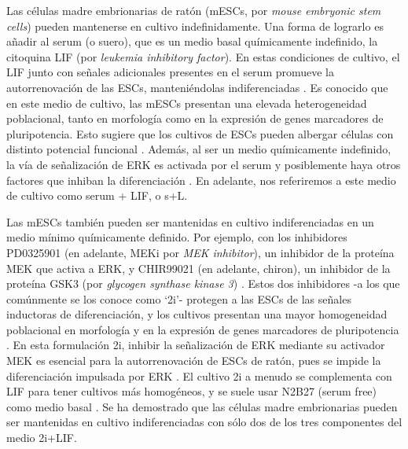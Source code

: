 \documentclass[./main.tex]{subfiles}
\begin{document}
Las células madre embrionarias de ratón (mESCs, por \textit{mouse embryonic stem cells}) pueden mantenerse en cultivo indefinidamente. Una forma de lograrlo es añadir al serum (o suero), que es un medio basal químicamente indefinido, la citoquina LIF (por \textit{leukemia inhibitory factor}). En estas condiciones de cultivo, el LIF junto con señales adicionales presentes en el serum promueve la autorrenovación de las ESCs, manteniéndolas indiferenciadas \cite{Smith1988,Ying2003,Ohtsuka2008,Morgani2013}. Es conocido que en este medio de cultivo, las mESCs presentan una elevada heterogeneidad poblacional, tanto en morfología como en la expresión de genes marcadores de pluripotencia. Esto sugiere que los cultivos de ESCs pueden albergar células con distinto potencial funcional \cite{Canham2010,Chambers2007,Hayashi2008,Kobashi2009,Singh2007,Toyooka2008,Yamanaka2010}. Además, al ser un medio químicamente indefinido, la vía de señalización de ERK es activada por el serum  y posiblemente haya otros factores que inhiban la diferenciación \cite{Roux2004,Lavoie2020}. En adelante, nos referiremos a este medio de cultivo como serum + LIF, o s+L.   


Las mESCs también pueden ser mantenidas en cultivo indiferenciadas en un medio mínimo químicamente definido. Por ejemplo, con los inhibidores PD0325901 (en adelante, MEKi por \textit{MEK inhibitor}), un inhibidor de la proteína MEK que activa a ERK, y CHIR99021 (en adelante, chiron), un inhibidor de la proteína GSK3 (por \textit{glycogen synthase kinase 3}) \cite{Marks2012}. Estos dos inhibidores -a los que comúnmente se los conoce como ‘2i’- protegen a las ESCs de las señales inductoras de diferenciación, y los cultivos presentan una mayor homogeneidad poblacional en morfología y en la expresión de genes marcadores de pluripotencia \cite{Nichols2009,Wray2010,Wray2011}. En esta formulación 2i, inhibir la señalización de ERK mediante su activador MEK es esencial para la autorrenovación de ESCs de ratón, pues se impide la diferenciación impulsada por ERK \cite{Lavoie2020,Chen2015,Lavoie2020,Weinberger2016}. El cultivo 2i a menudo se complementa con LIF para tener cultivos más homogéneos, y se suele usar N2B27 (serum free) como medio basal \cite{Morgani2013,Ying2008}. Se ha demostrado que las células madre embrionarias pueden ser mantenidas en cultivo indiferenciadas con sólo dos de los tres componentes del medio 2i+LIF. 

\end{document}
